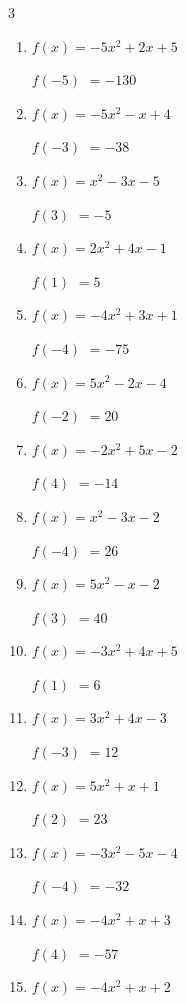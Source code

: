 \begin{multicols}{3}
\begin{enumerate}
$f(-4)$
        $= -77$

\columnbreak %

  \item $f(x)=-5x^{2}+2x+5$

$f(-5)$
        $= -130$

  \item $f(x)=-5x^{2}-x+4$

$f(-3)$
        $= -38$

  \item $f(x)=x^{2}-3x-5$

$f(3)$
        $= -5$

  \item $f(x)=2x^{2}+4x-1$

$f(1)$
        $= 5$

  \item $f(x)=-4x^{2}+3x+1$

$f(-4)$
        $= -75$

  \item $f(x)=5x^{2}-2x-4$

$f(-2)$
        $= 20$

  \item $f(x)=-2x^{2}+5x-2$

$f(4)$
        $= -14$

  \item $f(x)=x^{2}-3x-2$

$f(-4)$
        $= 26$

  \item $f(x)=5x^{2}-x-2$

$f(3)$
        $= 40$

  \item $f(x)=-3x^{2}+4x+5$

$f(1)$
        $= 6$

  \item $f(x)=3x^{2}+4x-3$

$f(-3)$
        $= 12$

  \item $f(x)=5x^{2}+x+1$

$f(2)$
        $= 23$

  \item $f(x)=-3x^{2}-5x-4$

$f(-4)$
        $= -32$

  \item $f(x)=-4x^{2}+x+3$

$f(4)$
        $= -57$

  \item $f(x)=-4x^{2}+x+2$


\end{enumerate}
\end{multicols}
